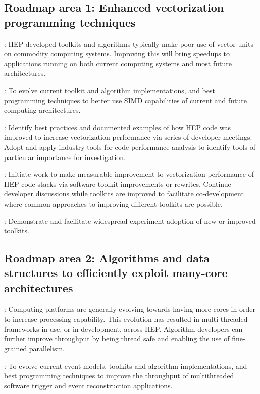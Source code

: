 \subsection{Roadmap area 1: Enhanced vectorization programming techniques}
: HEP developed toolkits and algorithms typically make poor use of vector units on commodity computing systems. Improving this will bring speedups to applications running 
on both current computing systems and most future architectures.

: To evolve current toolkit and algorithm implementations, and best programming techniques to better use SIMD capabilities of current and future computing architectures.

\vskip 0.5cm
: Identify best practices and documented examples of how HEP code was improved to increase vectorization performance via series of developer meetings. Adopt and apply 
industry tools for code performance analysis to identify tools of particular importance for investigation.

\vskip 0.5cm
: Initiate work to make measurable improvement to vectorization performance of HEP code stacks via software toolkit improvements or rewrites. Continue developer 
discussions while toolkits are improved to facilitate co-development where common approaches to improving different toolkits are possible. 

\vskip 0.5cm
: Demonstrate and facilitate widespread experiment adoption of new or improved toolkits.

\subsection{Roadmap area 2: Algorithms and data structures to efficiently exploit many-core architectures}
: Computing platforms are generally evolving towards having more cores in order to increase processing capability. This evolution has resulted in multi-threaded frameworks 
in use, or in development, across HEP. Algorithm developers can further improve throughput by being thread safe and enabling the use of fine-grained parallelism. 

\vskip 0.5cm
: To evolve current event models, toolkits and algorithm implementations, and best programming techniques to improve the throughput of multithreaded software trigger and 
event reconstruction applications.

